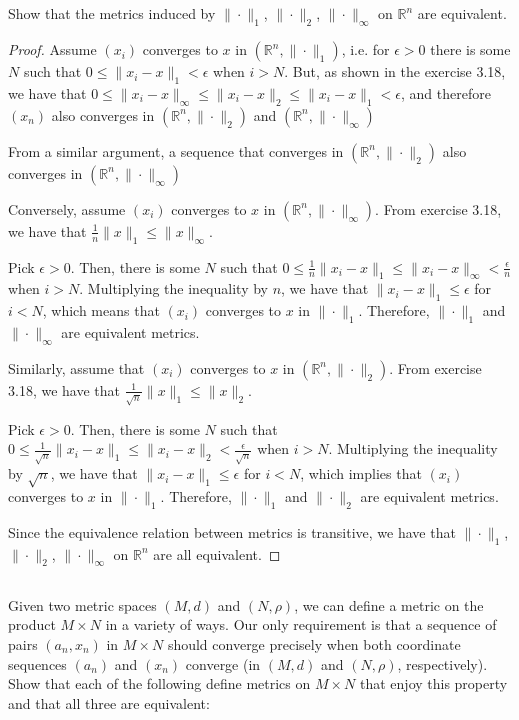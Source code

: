 \subsection{} Show that the metrics induced by $\|\cdot \|_1$, $\|\cdot \|_2$, $\|\cdot \|_\infty$ on $\mathbb{R}^n$ are equivalent.

\begin{proof}
Assume $(x_i)$ converges to $x$ in $(\mathbb{R}^n, \|\cdot \|_1)$, i.e. for $\epsilon > 0$ there is some $N$ such that $0 \leq \|x_i - x\|_1 < \epsilon$ when $i>N$. But, as shown in the exercise 3.18, we have that $0 \leq \|x_i - x\|_\infty \leq \|x_i - x\|_2 \leq \|x_i - x\|_1 < \epsilon$, and therefore $(x_n)$ also converges in $(\mathbb{R}^n, \|\cdot \|_2)$ and $(\mathbb{R}^n, \|\cdot \|_\infty)$

From a similar argument, a sequence that converges in $(\mathbb{R}^n, \|\cdot \|_2)$ also converges in $(\mathbb{R}^n, \|\cdot \|_\infty)$

Conversely, assume $(x_i)$ converges to $x$ in $(\mathbb{R}^n, \|\cdot \|_\infty)$. From exercise 3.18, we have that $\frac{1}{n}\|x\|_1 \leq \|x\|_\infty$.

Pick $\epsilon > 0$. Then, there is some $N$ such that $0 \leq \frac{1}{n}\|x_i - x\|_1 \leq \|x_i - x\|_\infty < \frac{\epsilon}{n}$ when $i > N$. Multiplying the inequality by $n$, we have that $\|x_i - x\|_1 \leq \epsilon$ for $i < N$, which means that $(x_i)$ converges to $x$ in $\|\cdot \|_1$. Therefore, $\|\cdot \|_1$ and $\|\cdot \|_\infty$ are equivalent metrics.

Similarly, assume that  $(x_i)$ converges to $x$ in $(\mathbb{R}^n, \|\cdot \|_2)$. From exercise 3.18, we have that $\frac{1}{\sqrt{n}}\|x\|_1 \leq \|x\|_2$.

Pick $\epsilon > 0$. Then, there is some $N$ such that $0 \leq \frac{1}{\sqrt{n}}\|x_i - x\|_1 \leq \|x_i - x\|_2 < \frac{\epsilon}{\sqrt{n}}$ when $i > N$.  Multiplying the inequality by $\sqrt{n}$, we have that $\|x_i - x\|_1 \leq \epsilon$ for $i < N$, which implies that $(x_i)$ converges to $x$ in $\|\cdot \|_1$. Therefore,  $\|\cdot \|_1$ and $\|\cdot \|_2$ are equivalent metrics.

Since the equivalence relation between metrics is transitive, we have that 
$\|\cdot \|_1$, $\|\cdot \|_2$, $\|\cdot \|_\infty$ on $\mathbb{R}^n$ are all equivalent.
\end{proof}


\subsection{} Given two metric spaces $(M, d)$ and $(N, \rho)$, we can define a metric on the product $M \times N$ in a  variety of ways. Our only requirement is  that a sequence of pairs $(a_n, x_n)$ in $M \times N$ should converge precisely when both coordinate sequences $(a_n)$ and $(x_n)$ converge (in $(M, d)$ and $(N, \rho)$, respectively). Show that each of the following define metrics on $M \times N$ that enjoy this property and that all three are equivalent:

